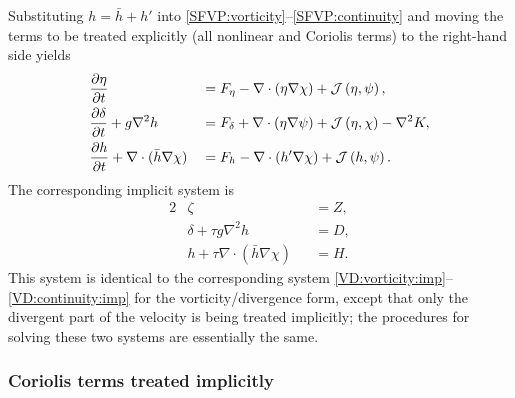 \documentclass[12pt]{article}
\newcommand{\href}{\bar{h}}
\newcommand{\del}{\nabla}
\newcommand{\jacobian}[2]{\mathcal{J}\left(#1,#2\right)}
\begin{document}
Substituting $h=\href+h'$ into \eqref{SFVP:vorticity}--\eqref{SFVP:continuity}
and moving the terms to be treated explicitly (all nonlinear and Coriolis
terms) to the right-hand side yields
\begin{alignat}{2}
   &\frac{\partial \eta}{\partial t} &&=
      \Feta - \del\cdot(\eta\del\chi) + \jacobian{\eta}{\psi},
\label{SFVP:vorticity:split}
\\
   &\frac{\partial \delta}{\partial t} + g\del^2 h &&= 
      \Fdelta + \del\cdot(\eta\del\psi) + \jacobian{\eta}{\chi} - \del^2 K,
\label{SFVP:divergence:split}
\\
  &\frac{\partial h}{\partial t} + \del\cdot(\href\del\chi)
    &&= \Fmass - \del\cdot(h'\del\chi) + \jacobian{h}{\psi} .
\label{SFVP:continuity:split}
\end{alignat}
The corresponding implicit system is
\begin{alignat}{2}
   &\zeta &&= Z ,
\label{SFVP:vorticity:imp}
\\
   &\delta + \tau g\del^2 h &&= D ,
\label{SFVP:divergence:imp}
\\
  &h + \tau\del\cdot(\href\del\chi) &&= H .
\label{SFVP:continuity:imp}
\end{alignat}
This system is identical to the corresponding system
\eqref{VD:vorticity:imp}--\eqref{VD:continuity:imp} for the
vorticity/divergence form, except that only the divergent part of the 
velocity is being treated implicitly; the procedures for solving these
two systems are essentially the same. 

\pagebreak[2]
\subsubsection{Coriolis terms treated implicitly}
\end{document}
